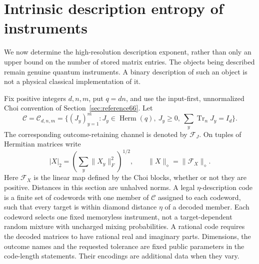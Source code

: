 \section{Intrinsic description entropy of instruments}\label{sec:description67}
We now determine the high-resolution description exponent, rather than
only an upper bound on the number of stored matrix entries. The objects
being described remain genuine quantum instruments. A binary description
of such an object is not a physical classical implementation of it.

Fix positive integers $d,n,m$, put $q=dn$, and use the input-first,
unnormalized Choi convention of Section~\ref{sec:reference66}. Let
\[
 \mathcal C=\mathcal C_{d,n,m}
 =\{(J_y)_{y=1}^m:J_y\in\operatorname{Herm}(q),\ J_y\ge0,
                       \ \sum_y\operatorname{Tr}_n J_y=I_d\}.
\]
The corresponding outcome-retaining channel is denoted by $\mathcal F_J$.
On tuples of Hermitian matrices write
\[
 |X|_2=\left(\sum_y\|X_y\|_F^2\right)^{1/2},\qquad
 \|X\|_{\diamond}=\|\mathcal F_X\|_{\diamond}.
\]
Here $\mathcal F_X$ is the linear map defined by the Choi blocks, whether
or not they are positive. Distances in this section are unhalved norms.
A legal $\eta$-description code is a finite set of codewords with one
member of $\mathcal C$ assigned to each codeword, such that every target
is within diamond distance $\eta$ of a decoded member. Each codeword
selects one fixed memoryless instrument, not a target-dependent random
mixture with uncharged mixing probabilities. A rational code
requires the decoded matrices to have rational real and imaginary parts.
Dimensions, the outcome names and the requested tolerance are fixed
public parameters in the code-length statements. Their encodings are
additional data when they vary.


